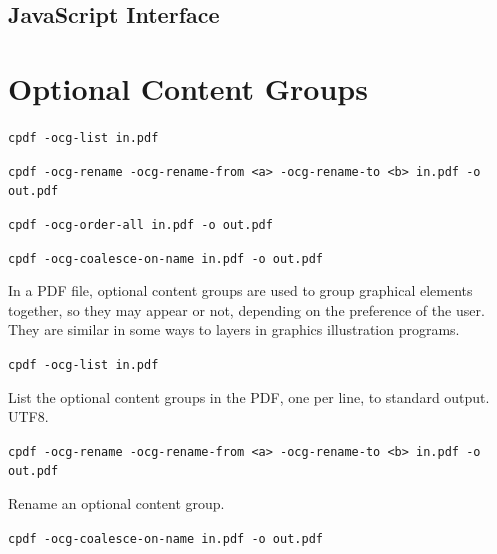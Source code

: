 \documentclass{book}
\begin{document}
\begin{jscpdflib}
\clearpage
\section*{JavaScript Interface}
\begin{small}\tt

\end{small}
\end{jscpdflib}

\clearpage\pagestyle{empty}
\chapter{Optional Content Groups}\label{chap:16}\pagestyle{fancy}

  {\small\begin{framed}
  \noindent\verb!cpdf -ocg-list in.pdf!

  \vspace{1.5mm}
  \noindent\verb!cpdf -ocg-rename -ocg-rename-from <a> -ocg-rename-to <b> in.pdf -o out.pdf!

  \vspace{1.5mm}
  \noindent\verb!cpdf -ocg-order-all in.pdf -o out.pdf!

  \vspace{1.5mm}
  \noindent\verb!cpdf -ocg-coalesce-on-name in.pdf -o out.pdf!

  \end{framed}}


In a PDF file, optional content groups are used to group graphical elements together, so they may appear or not, depending on the preference of the user. They are similar in some ways to layers in graphics illustration programs.

  {\small\begin{framed}
  \noindent\verb!cpdf -ocg-list in.pdf!
  \end{framed}}

\noindent List the optional content groups in the PDF, one per line, to standard output. UTF8.
  
  {\small\begin{framed}
  \noindent\verb!cpdf -ocg-rename -ocg-rename-from <a> -ocg-rename-to <b> in.pdf -o out.pdf!
  \end{framed}}

\noindent Rename an optional content group.



  {\small\begin{framed}
  \noindent\verb!cpdf -ocg-coalesce-on-name in.pdf -o out.pdf!
  \end{framed}}
\end{document}
